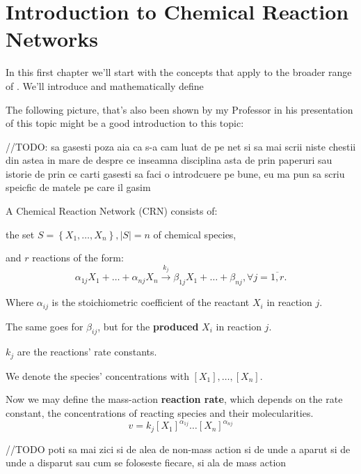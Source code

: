 \chapter{Introduction to Chemical Reaction Networks}\label{chap:ch1}

In this first chapter we'll start with the concepts that apply to the broader range of . We'll introduce and mathematically define

The following picture, that's also been shown by my Professor in his presentation of this topic might be a good introduction to this topic:

\hfill\break
//TODO: sa gasesti poza aia ca s-a cam luat de pe net
si sa mai scrii niste chestii din astea in mare de despre ce inseamna disciplina asta de prin paperuri sau istorie de prin ce carti gasesti sa faci o introdcuere pe bune, eu ma pun sa scriu speicfic de matele pe care il gasim
\hfill\break

A Chemical Reaction Network (CRN) consists of:

the set $S = \left\{ X_1, \dots, X_n \right\}, \left| S \right| = n$ of chemical species,

and $r$ reactions of the form:
\[
	\alpha_{1j} X_1 + \dots + \alpha_{n j} X_n \xrightarrow{k_j} \beta_{1j} X_1 + \dots + \beta_{n j}, \forall j = \overline{1,r}.
\]

Where $\alpha_{ij}$ is the stoichiometric coefficient of the reactant $X_i$ in reaction $j$.

The same goes for $\beta_{ij}$, but for the \textbf{produced} $X_i$ in reaction $j$.

$k_j$ are the reactions' rate constants.

We denote the species' concentrations with $[X_1], \dots, [X_n]$.

Now we may define the mass-action \textbf{reaction rate}, which depends on the rate constant, the concentrations of reacting species and their molecularities.
\[
	v = k_j [X_1]^{\alpha_{1j}} \dots [X_n]^{\alpha_{nj}}
\]

\hfill\break
//TODO poti sa mai zici si de alea de non-mass action si de unde a aparut si de unde a disparut sau cum se foloseste fiecare, si ala de mass action
\hfill\break

